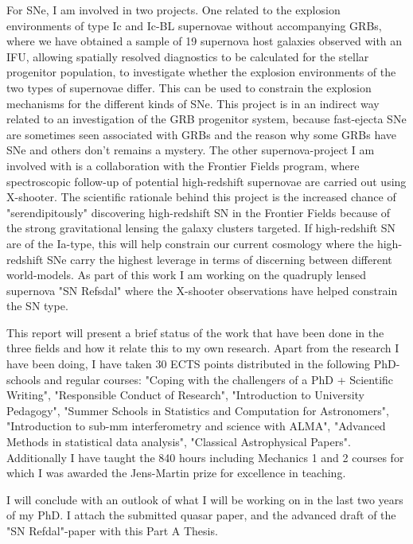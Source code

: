 For SNe, I am involved in two projects. One related to the explosion
environments of type Ic and Ic-BL supernovae without accompanying GRBs, where we
have obtained a sample of 19 supernova host galaxies observed with an IFU,
allowing spatially resolved diagnostics to be calculated for the stellar
progenitor population, to investigate whether the explosion environments of the
two types of supernovae differ. This can be used to constrain the explosion
mechanisms for the different kinds of SNe. This project is in an indirect way
related to an investigation of the GRB progenitor system, because fast-ejecta
SNe are sometimes seen associated with GRBs and the reason why some GRBs have
SNe and others don't remains a mystery. The other supernova-project I am
involved with is a collaboration with the Frontier Fields program, where
spectroscopic follow-up of potential high-redshift supernovae are carried out
using X-shooter. The scientific rationale behind this project is the increased
chance of "serendipitously" discovering high-redshift SN in the Frontier Fields
because of the strong gravitational lensing the galaxy clusters targeted. If
high-redshift SN are of the Ia-type, this will help constrain our current
cosmology where the high-redshift SNe carry the highest leverage in terms of
discerning between different world-models. As part of this work I am working on
the quadruply lensed supernova "SN Refsdal" where the X-shooter observations
have helped constrain the SN type.

This report will present a brief status of the work that have been done in the
three fields and how it relate this to my own research. Apart from the research
I have been doing, I have taken 30 ECTS points distributed in the following
PhD-schools and regular courses: "Coping with the challengers of a PhD +
Scientific Writing", "Responsible Conduct of Research", "Introduction to
University Pedagogy", "Summer Schools in Statistics and Computation for
Astronomers", "Introduction to sub-mm interferometry and science with ALMA",
"Advanced Methods in statistical data analysis", "Classical Astrophysical
Papers". Additionally I have taught the 840 hours including Mechanics 1 and 2
courses for which I was awarded the Jens-Martin prize for excellence in
teaching.

I will conclude with an outlook of what I will be working on in the last two
years of my PhD. 
I attach the submitted quasar paper, and the advanced draft of the "SN Refdal"-paper with this Part A Thesis.

\clearpage

